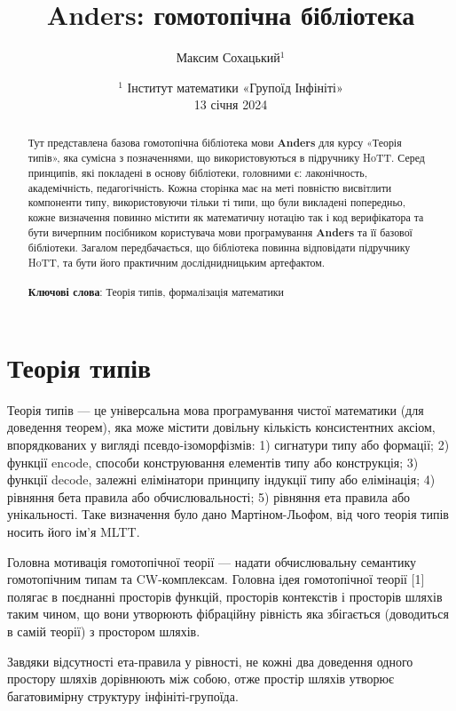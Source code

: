 \documentclass{article}
\theoremstyle{definition}
\begin{document}
\title{Anders: гомотопічна бібліотека}
\author{Максим Сохацький$^1$ }
\date{ \small $^1$ Інститут математики «Групоїд Інфініті» \\
       13 січня 2024 }
\maketitle

\begin{abstract}
Тут представлена базова гомотопічна бібліотека мови {\bf Anders} для курсу «Теорія типів»,
яка сумісна з позначеннями, що використовуються в підручнику HoTT.
Серед принципів, які покладені в основу бібліотеки, головними є:
лаконічность, академічність, педагогічність. Кожна сторінка має
на меті повністю висвітлити компоненти типу, використовуючи тільки
ті типи, що були викладені попередньо, кожне визначення повинно
містити як математичну нотацію так і код верифікатора та бути
вичерпним посібником користувача мови програмування {\bf Anders} та
її базової бібліотеки. Загалом передбачається, що бібліотека
повинна відповідати підручнику HoTT, та бути його практичним
досліднидницьким артефактом.
\\
\\
{\bf Ключові слова}: Теорія типів, формалізація математики
\end{abstract}

\section*{Теорія типів}
Теорія типів --- це універсальна мова програмування чистої
математики (для доведення теорем), яка може містити довільну
кількість консистентних аксіом, впорядкованих у вигляді псевдо-ізоморфізмів:
1) сигнатури типу або формації;
2) функції encode, способи конструювання елементів типу або конструкція;
3) функції decode, залежні елімінатори принципу індукції типу або елімінація;
4) рівняння бета правила або обчислювальності;
5) рівняння ета правила або унікальності.
Таке визначення було дано Мартіном-Льофом,
від чого теорія типів носить його ім'я MLTT.

Головна мотивація гомотопічної теорії — надати обчислювальну
семантику гомотопічним типам та CW-комплексам. Головна ідея
гомотопічної теорії [1] полягає в поєднанні просторів функцій,
просторів контекстів  і просторів шляхів  таким чином, що вони
утворюють фібраційну рівність яка збігається (доводиться в самій
теорії) з простором шляхів.

Завдяки відсутності ета-правила у рівності, не кожні два
доведення одного простору шляхів дорівнюють між собою, отже
простір шляхів утворює багатовимірну структуру інфініті-групоїда.
\end{document}
